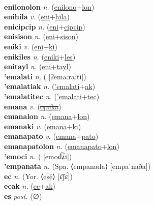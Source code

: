  \label{enilono} \\
\textbf{enilonolon} \textit{n.} (\hyperref[enilono]{enilono}+\hyperref[lon]{lon})
 \label{enilonolon} \\
\textbf{enihila} \textit{v.} (\hyperref[eni]{eni}+\hyperref[hila]{hila})
 \label{enihila} \\
\textbf{enicipcip} \textit{n.} (\hyperref[eni]{eni}+\hyperref[cipcip]{cipcip})
 \label{enicipcip} \\
\textbf{enisison} \textit{n.} (\hyperref[eni]{eni}+\hyperref[sison]{sison})
 \label{enisison} \\
\textbf{eniki} \textit{v.} (\hyperref[eni]{eni}+\hyperref[ki]{ki})
 \label{eniki} \\
\textbf{enikiles} \textit{n.} (\hyperref[eniki]{eniki}+\hyperref[les]{les})
 \label{enikiles} \\
\textbf{enitayl} \textit{n.} (\hyperref[eni]{eni}+\hyperref[tayl]{tayl})
 \label{enitayl} \\
\textbf{'emalati} \textit{n.} ( [ʔemaːraːti])
 \label{'emalati} \\
\textbf{'emalatiak} \textit{n.} (\hyperref['emalati]{'emalati}+\hyperref[ak]{ak})
 \label{'emalatiak} \\
\textbf{'emalatitec} \textit{n.} (\hyperref['emalati]{'emalati}+\hyperref[tec]{tec})
 \label{'emalatitec} \\
\textbf{emana} \textit{v.} (\hyperref[opaka]{\sout{opaka}})
 \label{emana} \\
\textbf{emanalon} \textit{n.} (\hyperref[emana]{emana}+\hyperref[lon]{lon})
 \label{emanalon} \\
\textbf{emanaki} \textit{v.} (\hyperref[emana]{emana}+\hyperref[ki]{ki})
 \label{emanaki} \\
\textbf{emanapato} \textit{v.} (\hyperref[emana]{emana}+\hyperref[pato]{pato})
 \label{emanapato} \\
\textbf{emanapatolon} \textit{n.} (\hyperref[emanapato]{emanapato}+\hyperref[lon]{lon})
 \label{emanapatolon} \\
\textbf{'emoci} \textit{n.} ( [emod͡ʑi])
 \label{'emoci} \\
\textbf{'empanata} \textit{n.} (Spa. ⟨empanada⟩ [empaˈnaða])
 \label{'empanata} \\
\textbf{ec} \textit{n.} (Yor. ⟨ẹṣẹ́⟩ [ɛ̄ʃɛ́])
 \label{ec} \\
\textbf{ecak} \textit{n.} (\hyperref[ec]{ec}+\hyperref[ak]{ak})
 \label{ecak} \\
\textbf{es} \textit{post.} (∅)
